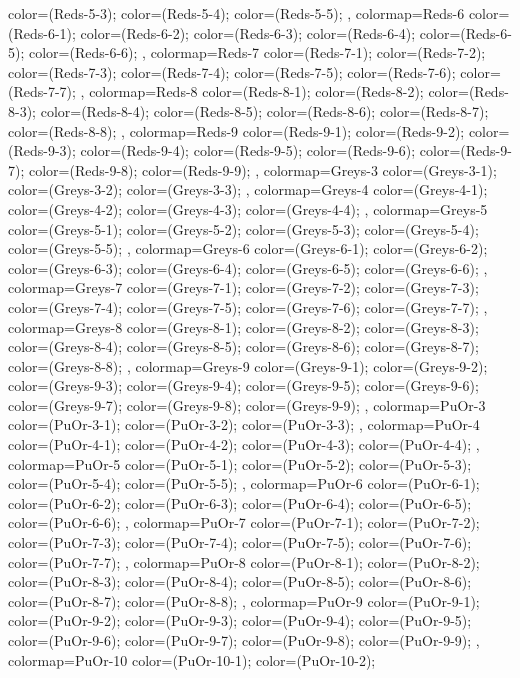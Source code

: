 {{color=(Reds-5-3);
color=(Reds-5-4);
color=(Reds-5-5);
},
colormap={Reds-6}{
color=(Reds-6-1);
color=(Reds-6-2);
color=(Reds-6-3);
color=(Reds-6-4);
color=(Reds-6-5);
color=(Reds-6-6);
},
colormap={Reds-7}{
color=(Reds-7-1);
color=(Reds-7-2);
color=(Reds-7-3);
color=(Reds-7-4);
color=(Reds-7-5);
color=(Reds-7-6);
color=(Reds-7-7);
},
colormap={Reds-8}{
color=(Reds-8-1);
color=(Reds-8-2);
color=(Reds-8-3);
color=(Reds-8-4);
color=(Reds-8-5);
color=(Reds-8-6);
color=(Reds-8-7);
color=(Reds-8-8);
},
colormap={Reds-9}{
color=(Reds-9-1);
color=(Reds-9-2);
color=(Reds-9-3);
color=(Reds-9-4);
color=(Reds-9-5);
color=(Reds-9-6);
color=(Reds-9-7);
color=(Reds-9-8);
color=(Reds-9-9);
},
colormap={Greys-3}{
color=(Greys-3-1);
color=(Greys-3-2);
color=(Greys-3-3);
},
colormap={Greys-4}{
color=(Greys-4-1);
color=(Greys-4-2);
color=(Greys-4-3);
color=(Greys-4-4);
},
colormap={Greys-5}{
color=(Greys-5-1);
color=(Greys-5-2);
color=(Greys-5-3);
color=(Greys-5-4);
color=(Greys-5-5);
},
colormap={Greys-6}{
color=(Greys-6-1);
color=(Greys-6-2);
color=(Greys-6-3);
color=(Greys-6-4);
color=(Greys-6-5);
color=(Greys-6-6);
},
colormap={Greys-7}{
color=(Greys-7-1);
color=(Greys-7-2);
color=(Greys-7-3);
color=(Greys-7-4);
color=(Greys-7-5);
color=(Greys-7-6);
color=(Greys-7-7);
},
colormap={Greys-8}{
color=(Greys-8-1);
color=(Greys-8-2);
color=(Greys-8-3);
color=(Greys-8-4);
color=(Greys-8-5);
color=(Greys-8-6);
color=(Greys-8-7);
color=(Greys-8-8);
},
colormap={Greys-9}{
color=(Greys-9-1);
color=(Greys-9-2);
color=(Greys-9-3);
color=(Greys-9-4);
color=(Greys-9-5);
color=(Greys-9-6);
color=(Greys-9-7);
color=(Greys-9-8);
color=(Greys-9-9);
},
colormap={PuOr-3}{
color=(PuOr-3-1);
color=(PuOr-3-2);
color=(PuOr-3-3);
},
colormap={PuOr-4}{
color=(PuOr-4-1);
color=(PuOr-4-2);
color=(PuOr-4-3);
color=(PuOr-4-4);
},
colormap={PuOr-5}{
color=(PuOr-5-1);
color=(PuOr-5-2);
color=(PuOr-5-3);
color=(PuOr-5-4);
color=(PuOr-5-5);
},
colormap={PuOr-6}{
color=(PuOr-6-1);
color=(PuOr-6-2);
color=(PuOr-6-3);
color=(PuOr-6-4);
color=(PuOr-6-5);
color=(PuOr-6-6);
},
colormap={PuOr-7}{
color=(PuOr-7-1);
color=(PuOr-7-2);
color=(PuOr-7-3);
color=(PuOr-7-4);
color=(PuOr-7-5);
color=(PuOr-7-6);
color=(PuOr-7-7);
},
colormap={PuOr-8}{
color=(PuOr-8-1);
color=(PuOr-8-2);
color=(PuOr-8-3);
color=(PuOr-8-4);
color=(PuOr-8-5);
color=(PuOr-8-6);
color=(PuOr-8-7);
color=(PuOr-8-8);
},
colormap={PuOr-9}{
color=(PuOr-9-1);
color=(PuOr-9-2);
color=(PuOr-9-3);
color=(PuOr-9-4);
color=(PuOr-9-5);
color=(PuOr-9-6);
color=(PuOr-9-7);
color=(PuOr-9-8);
color=(PuOr-9-9);
},
colormap={PuOr-10}{
color=(PuOr-10-1);
color=(PuOr-10-2);
}}
